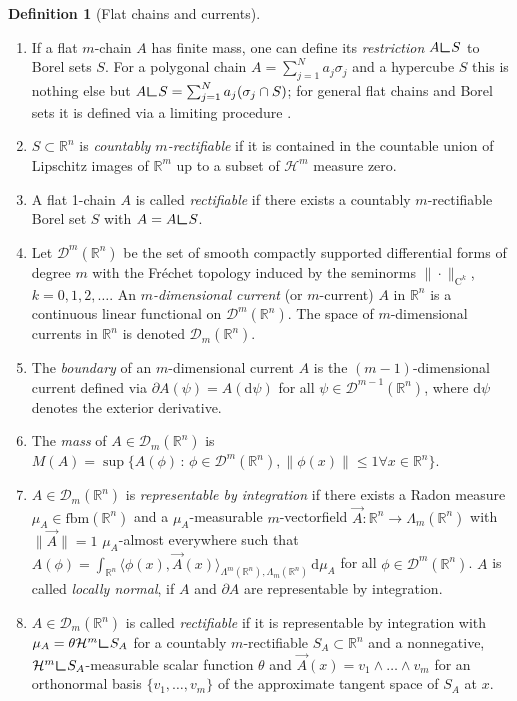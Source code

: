 \documentclass[10pt,a4paper,oneside,final]{article}
\newcommand{\R}{{\mathbb{R}}}
\newcommand{\de}{{\mathrm{d}}}
\newcommand{\hd}{\mathcal{H}}
\newcommand{\fbm}{{\mathrm{fbm}}}
\newcommand{\restr}{{\mbox{\LARGE$\llcorner$}}}
\newcommand{\diffForms}[1]{{\mathcal{D}^{#1}}}
\newcommand{\currents}[1]{{\mathcal{D}_{#1}}}
\newcommand{\mass}[1]{M(#1)}
\newcommand{\flatNorm}[1]{|#1|^\flat}
\newcommand{\flatChains}[1]{\mathbf F_{#1}}
\newcommand{\cont}{{\mathrm{C}}}
\numberwithin{equation}{section}
\theoremstyle{plain}
\theoremstyle{definition}
\newtheorem{definition}[theorem]{Definition}
\theoremstyle{remark}
\begin{document}
\begin{definition}[Flat chains and currents]
\begin{enumerate}
$\rho(\sum_{j=1}^Na_j\sigma_j)=\sum_{j=1}^Na_j\rho(a_j)\hd^m(\sigma_j)$.
In turn, any such functional on polyhedral $m$-chains \emph{induces a functional} $\rho:\flatChains{m}\to[-\infty,\infty]$ via relaxation,
that is, $\rho(A)=\inf\{\liminf_{k\to\infty}\rho(A_k)\ :\ A_k\text{ is polyhedral $m$-chain, }\flatNorm{A_k-A}\to0\text{ as }k\to\infty\}$.
Also the notion of mass is extended to $\flatChains{m}$ in this way.
\item If a flat $m$-chain $A$ has finite mass, one can define its \emph{restriction} $A\restr S$ to Borel sets $S$.
For a polygonal chain $A=\sum_{j=1}^Na_j\sigma_j$ and a hypercube $S$ this is nothing else but $A\restr S=\sum_{j=1}^Na_j(\sigma_j\cap S)$;
for general flat chains and Borel sets it is defined via a limiting procedure \cite[Sec.\,4]{Fl66}.
\item $S\subset\R^n$ is \emph{countably $m$-rectifiable} if it is contained in the countable union of Lipschitz images of $\R^m$ up to a subset of $\hd^m$ measure zero.
\item A flat 1-chain $A$ is called \emph{rectifiable} if there exists a countably $m$-rectifiable Borel set $S$ with $A=A\restr S$.
\item Let $\diffForms{m}(\R^n)$ be the set of smooth compactly supported differential forms of degree $m$ with the Fr\'echet topology induced by the seminorms $\|\cdot\|_{\cont^k}$, $k=0,1,2,\ldots$.
An \emph{$m$-dimensional current} (or $m$-current) $A$ in $\R^n$ is a continuous linear functional on $\diffForms{m}(\R^n)$.
The space of $m$-dimensional currents in $\R^n$ is denoted $\currents m(\R^n)$.
\item The \emph{boundary} of an $m$-dimensional current $A$ is the $(m-1)$-dimensional current defined via $\partial A(\psi)=A(\de\psi)$ for all $\psi\in\diffForms{m-1}(\R^n)$, where $\de\psi$ denotes the exterior derivative.
\item The \emph{mass} of $A\in\currents m(\R^n)$ is $\mass A=\sup\{A(\phi)\,:\,\phi\in\diffForms m(\R^n),\|\phi(x)\|\leq1\forall x\in\R^n\}$.
\item $A\in\currents m(\R^n)$ is \emph{representable by integration}
if there exists a Radon measure $\mu_A\in\fbm(\R^n)$ and a $\mu_A$-measurable $m$-vectorfield $\vec A:\R^n\to\Lambda_m(\R^n)$ with $\|\vec A\|=1$ $\mu_A$-almost everywhere
such that $A(\phi)=\int_{\R^n}\langle\phi(x),\vec A(x)\rangle_{\Lambda^m(\R^n),\Lambda_m(\R^n)}\,\de\mu_A$ for all $\phi\in\diffForms m(\R^n)$.
$A$ is called \emph{locally normal}, if $A$ and $\partial A$ are representable by integration.
\item $A\in\currents m(\R^n)$ is called \emph{rectifiable} if it is representable by integration
with $\mu_A=\theta\hd^m\restr S_A$ for a countably $m$-rectifiable $S_A\subset\R^n$ and a nonnegative, $\hd^m\restr S_A$-measurable scalar function $\theta$
and $\vec A(x)=v_1\wedge\ldots\wedge v_m$ for an orthonormal basis $\{v_1,\ldots,v_m\}$ of the approximate tangent space of $S_A$ at $x$.
\end{enumerate}
\end{definition}
\end{document}
